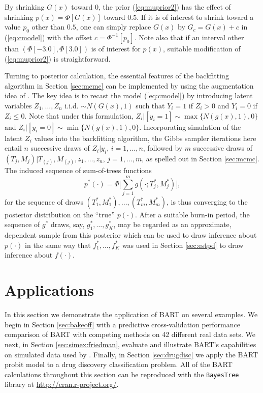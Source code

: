 \documentclass[aoas,nameyear,dvips]{arximspdf}
\newcommand{\citeasnoun}[1]{\citet{#1}}
\begin{document}
By shrinking $G(x)$ toward 0, the prior (\ref{eq:muprior2}) has the effect of shrinking
$p(x) = \Phi[G(x)]$ toward $0.5$.  If it is of interest to shrink toward
a value $p_0$ other than $0.5$, one can simply replace $G(x)$ by $G_c = G(x)+ c$ in
(\ref{eq:cmodel}) with the offset $c = \Phi^{-1}[p_0]$.  Note also that if an interval other than $(\Phi[-3.0], \Phi[3.0])$
is of interest for $p(x)$, suitable modification of (\ref{eq:muprior2}) is straightforward.

Turning to posterior calculation, the essential features of the
backfitting algorithm in Section \ref{sec:mcmc} can be implemented by
using the augmentation idea of \citeasnoun{AlbeChib1993}. The key idea
is to recast the model (\ref{eq:cmodel}) by introducing latent
variables $Z_1,\ldots,Z_n$ i.i.d. $\sim N(G(x), 1)$ such that $Y_i = 1$
if $Z_i > 0$ and $Y_i = 0$ if $Z_i \le 0$.  Note that under this
formulation, $Z_i  |  [y_i = 1] \sim \max\{N(g(x), 1), 0\}$ and $Z_i
|  [y_i = 0] \sim \min\{N(g(x), 1), 0\}$.  Incorporating simulation of
the latent $Z_i$ values into the backfitting algorithm, the Gibbs
sampler iterations here entail $n$ successive draws of $Z_i  |  y_i$,
$i = 1,\dots, n$,  followed by $m$ successive draws of $(T_j,M_j) |T_{(j)}, M_{(j)}, z_1,\ldots,z_n$, $j = 1,\ldots,m$, as spelled out in
Section \ref{sec:mcmc}.  The induced sequence of sum-of-trees functions
\begin{equation}\label{pstar}
p^*(\cdot) = \Phi \Biggl[\sum_{j=1}^m g(\cdot;T_j^*,M_j^*) \Biggr],
\end{equation}
for the sequence of draws $(T_1^*,M_1^*), \ldots,(T_m^*,M_m^*)$, is
thus converging to the posterior distribution on the ``true''
$p(\cdot)$.  After a suitable burn-in period, the sequence of $g^*$
draws, say, $g^*_1,\dots,g^*_K$, may be regarded as an approximate,
dependent sample from this posterior which can be used to draw
inference about $p(\cdot)$ in the same way that $f^*_1,\dots,f^*_K$ was
used in Section \ref{sec:estpd} to draw inference about $f(\cdot)$.


\section{Applications}\label{sec:examples}

In this section we demonstrate the application of BART on several
examples. We begin in Section \ref{sec:bakeoff} with a predictive
cross-validation performance comparison of BART with competing methods
on 42 different real data sets.  We next, in Section
\ref{sec:simex:friedman}, evaluate and illustrate BART's capabilities
on simulated data used by \citeasnoun{Frie1991}.  Finally, in Section
\ref{sec:drugdisc} we apply the BART probit model to a drug discovery
classification problem.  All of the BART calculations throughout this
section can be reproduced with the \texttt{BayesTree} library at
\url{http://cran.r-project.org/}.
\end{document}
